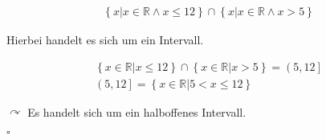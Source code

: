 
\begin{eqnarray}
\left\{x \vert x \in \mathbb{R} \land x \le 12 \right\} \cap \left\{ x \vert x \in \mathbb{R}  \land x > 5\right\} 
\end{eqnarray}

Hierbei handelt es sich um ein Intervall.

\begin{eqnarray}
	\left\{x \in \mathbb{R} \vert x \le 12 \right\} \cap \left\{ x \in \mathbb{R}  \vert x > 5\right\} = \left(5,12\right]\\
	\left(5,12\right] =	\left\{ x \in \mathbb{R} \vert 5 < x \le 12\right\}
\end{eqnarray}

$\curvearrowright$ Es handelt sich um ein halboffenes Intervall.

$\square$